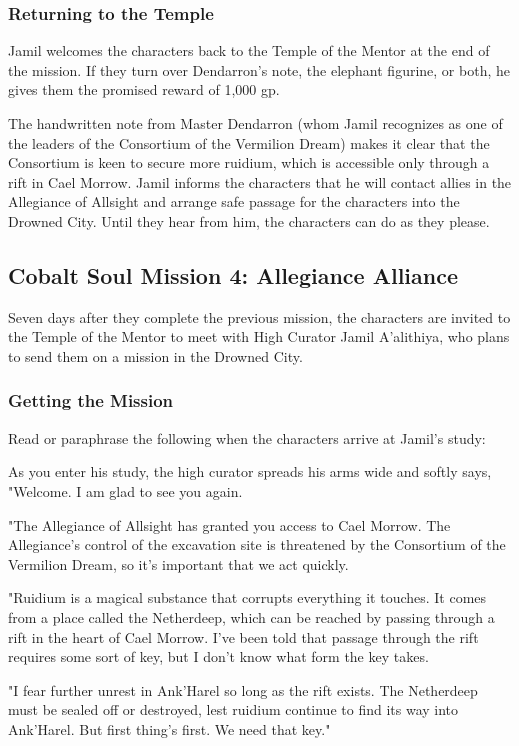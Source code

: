 \documentclass[10pt,a4paper,twoside,bg=print,twocolumn,openany,nodeprecatedcode]{dndbook}
\begin{document}
\subsubsection{Returning to the Temple}
Jamil welcomes the characters back to the Temple of the Mentor at the end of the mission. If they turn over Dendarron's note, the elephant figurine, or both, he gives them the promised reward of 1,000 gp.

The handwritten note from Master Dendarron (whom Jamil recognizes as one of the leaders of the Consortium of the Vermilion Dream) makes it clear that the Consortium is keen to secure more ruidium, which is accessible only through a rift in Cael Morrow. Jamil informs the characters that he will contact allies in the Allegiance of Allsight and arrange safe passage for the characters into the Drowned City. Until they hear from him, the characters can do as they please.

\subsection{Cobalt Soul Mission 4: Allegiance Alliance}
Seven days after they complete the previous mission, the characters are invited to the Temple of the Mentor to meet with High Curator Jamil A'alithiya, who plans to send them on a mission in the Drowned City.

\subsubsection{Getting the Mission}
Read or paraphrase the following when the characters arrive at Jamil's study:

\begin{DndReadAloud}{}
As you enter his study, the high curator spreads his arms wide and softly says, "Welcome. I am glad to see you again.

"The Allegiance of Allsight has granted you access to Cael Morrow. The Allegiance's control of the excavation site is threatened by the Consortium of the Vermilion Dream, so it's important that we act quickly.

"Ruidium is a magical substance that corrupts everything it touches. It comes from a place called the Netherdeep, which can be reached by passing through a rift in the heart of Cael Morrow. I've been told that passage through the rift requires some sort of key, but I don't know what form the key takes.

"I fear further unrest in Ank'Harel so long as the rift exists. The Netherdeep must be sealed off or destroyed, lest ruidium continue to find its way into Ank'Harel. But first thing's first. We need that key."

\end{DndReadAloud}
\end{document}
